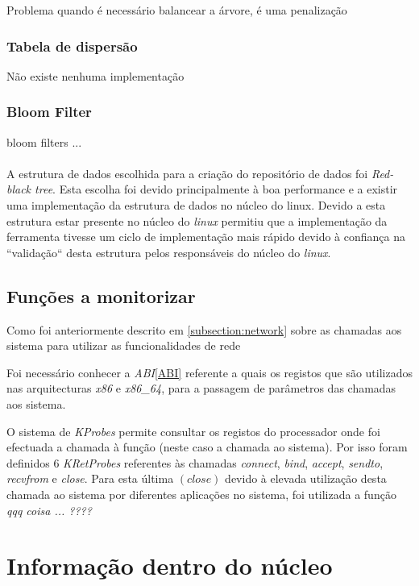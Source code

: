 Problema quando é necessário balancear a árvore, é uma penalização

\subsubsection{Tabela de dispersão}
Não existe nenhuma implementação 

\subsubsection{Bloom Filter}
bloom filters ...

\paragraph*{}
A estrutura de dados escolhida para a criação do repositório de dados foi
\textit{Red-black tree}. Esta escolha foi devido principalmente à boa
performance e a existir uma implementação da estrutura de dados no núcleo do
linux. Devido a esta estrutura estar presente no núcleo do \textit{linux}
permitiu que a implementação da ferramenta tivesse um ciclo de implementação
mais rápido devido à confiança na ``validação`` desta estrutura pelos
responsáveis do núcleo do \textit{linux}.

\subsection{Funções a monitorizar}

Como foi anteriormente descrito em \ref{subsection:network} sobre as chamadas
aos sistema para utilizar as funcionalidades de rede

Foi necessário conhecer a \textit{ABI}\ref{ABI}\cite{ABI} referente a quais os
registos que são utilizados nas arquitecturas \textit{x86} e \textit{x86\_64},
para a passagem de parâmetros das chamadas aos sistema.

O sistema de \textit{KProbes} permite consultar os registos do processador onde
foi efectuada a chamada à função (neste caso a chamada ao sistema). Por isso
foram definidos 6 \textit{KRetProbes} referentes às chamadas \textit{connect},
\textit{bind}, \textit{accept}, \textit{sendto}, \textit{recvfrom} e
\textit{close}. Para esta última $\left( \textit{close} \right)$ devido à
elevada utilização desta chamada ao sistema por diferentes aplicações no
sistema, foi utilizada a função \textit{qqq coisa ...  ????}

\section{Informação dentro do núcleo}

